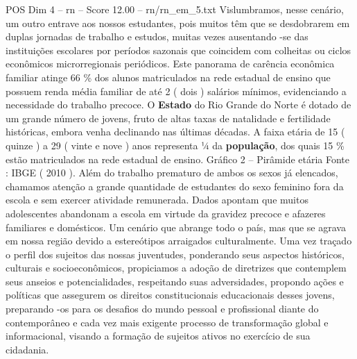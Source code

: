 \begin{textsample}{POS Dim 4 – rn – Score 12.00 – rn/rn\_em\_5.txt}
Vislumbramos, nesse cenário, um outro entrave aos nossos estudantes, pois muitos têm que se desdobrarem em duplas jornadas de trabalho e estudos, muitas vezes ausentando -se das instituições escolares por períodos sazonais que coincidem com colheitas ou ciclos econômicos microrregionais periódicos.
Este panorama de carência econômica familiar atinge 66 \% dos alunos matriculados na rede estadual de ensino que possuem renda média familiar de até 2 ( dois ) salários mínimos, evidenciando a necessidade do trabalho precoce.
O \textbf{Estado} do Rio Grande do Norte é dotado de um grande número de jovens, fruto de altas taxas de natalidade e fertilidade históricas, embora venha declinando nas últimas décadas.
A faixa etária de 15 ( quinze ) a 29 ( vinte e nove ) anos representa 1⁄4 da \textbf{população}, dos quais 15 \% estão matriculados na rede estadual de ensino.
Gráfico 2 – Pirâmide etária Fonte : IBGE ( 2010 ).
Além do trabalho prematuro de ambos os sexos já elencados, chamamos atenção a grande quantidade de estudantes do sexo feminino fora da escola e sem exercer atividade remunerada.
Dados apontam que muitos adolescentes abandonam a escola em virtude da gravidez precoce e afazeres familiares e domésticos.
Um cenário que abrange todo o país, mas que se agrava em nossa região devido a estereótipos arraigados culturalmente.
Uma vez traçado o perfil dos sujeitos das nossas juventudes, ponderando seus aspectos históricos, culturais e socioeconômicos, propiciamos a adoção de diretrizes que contemplem seus anseios e potencialidades, respeitando suas adversidades, propondo ações e políticas que assegurem os direitos constitucionais educacionais desses jovens, preparando -os para os desafios do mundo pessoal e profissional diante do contemporâneo e cada vez mais exigente processo de transformação global e informacional, visando a formação de sujeitos ativos no exercício de sua cidadania.

\end{textsample}
